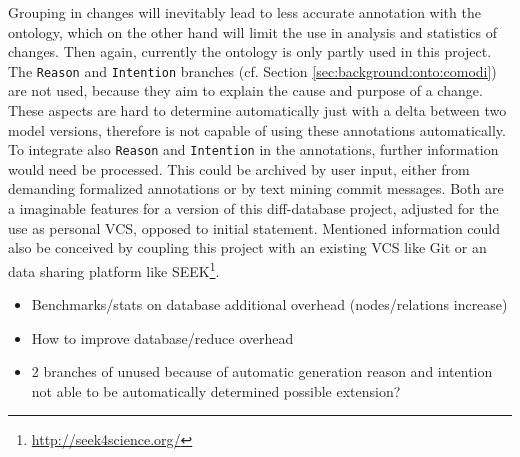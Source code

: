 Grouping in changes will inevitably lead to less accurate annotation with the \comodi ontology, which on the other hand will limit the use in analysis and statistics of changes. 
Then again, currently the \comodi ontology is only partly used in this project. The \texttt{Reason} and \texttt{Intention} branches (cf. Section \ref{sec:background:onto:comodi}) are not used, because they aim to explain the cause and purpose of a change. These aspects are hard to determine automatically just with a delta between two model versions, therefore is \bives not capable of using these annotations automatically.
To integrate also \texttt{Reason} and \texttt{Intention} in the annotations, further information would need be processed. This could be archived by user input, either from demanding formalized annotations or by text mining commit messages. 
Both are a imaginable features for a version of this diff-database project, adjusted for the use as personal VCS, opposed to initial statement.
Mentioned information could also be conceived by coupling this project with an existing VCS like Git or an data sharing platform like SEEK\footnote{\url{http://seek4science.org/}}.


\begin{itemize}
	\item Benchmarks/stats on database
		\subitem additional overhead (nodes/relations increase)
	\item How to improve database/reduce overhead
	\item 2 branches of \comodi unused
		\subitem because of automatic generation
		\subitem reason and intention not able to be automatically determined
		\subitem possible extension?
\end{itemize}
